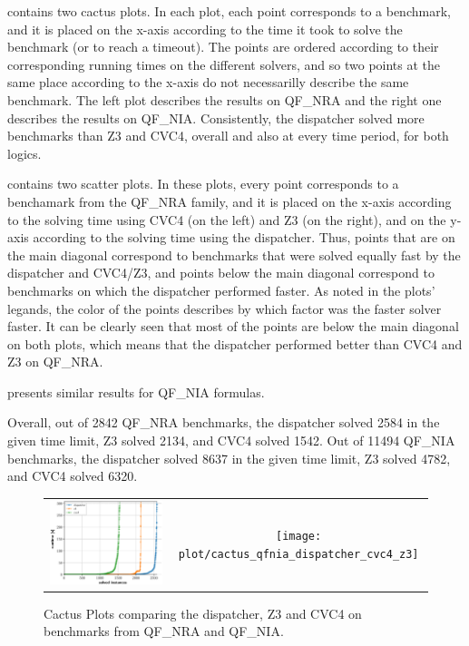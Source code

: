 \documentclass{article}
\begin{document}
 contains two cactus plots.
In each plot, each point corresponds to a benchmark, and it
is placed on the x-axis according to the time
it took to solve the benchmark (or to reach a timeout).
The points are ordered according to their corresponding
running times on the different solvers, and so
two points at the same place according to the x-axis
do not necessarilly describe the same benchmark.
The left plot describes the results on QF\_NRA and
the right one describes the results on QF\_NIA.
Consistently, the dispatcher solved more benchmarks
than Z3 and CVC4, overall and also at every time period,
for both logics.

 contains two scatter plots.
In these plots, every point corresponds to a benchamark
from the QF\_NRA family,
and it is placed on the x-axis according to the
solving time using CVC4 (on the left) and Z3 (on the right),
and on the y-axis according to the solving time using
the dispatcher.
%
Thus, points that are on the main diagonal correspond to benchmarks that
were solved equally fast by the dispatcher and CVC4/Z3,
and points below the main diagonal correspond
to benchmarks on which the dispatcher performed
faster.
%
As noted in the plots' legands, the color of the points
describes by which factor was the faster solver faster.
%
It can be clearly seen that most of the points are below the main diagonal on both plots,
which means that the dispatcher performed better
than CVC4 and Z3 on QF\_NRA.

 presents similar results for QF\_NIA formulas.

Overall, out of 2842 QF\_NRA benchmarks,
the dispatcher solved 2584 in the given time limit,
Z3 solved 2134, and
CVC4 solved 1542.
%
Out of 11494 QF\_NIA benchmarks,
the dispatcher solved 8637 in the given time limit,
Z3 solved 4782, and
CVC4 solved 6320.


\begin{figure}
\begin{center}
\begin{tabular}{cc}
\includegraphics[width=.5\textwidth]{plot/cactus_qfnra_dispatcher_cvc4_z3}
&
\texttt{[image: plot/cactus\_qfnia\_dispatcher\_cvc4\_z3]}  
\end{tabular}
\end{center}
\caption{\label{cactus}Cactus Plots comparing the dispatcher, Z3 and CVC4 on benchmarks from QF\_NRA and QF\_NIA.}
\end{figure}
\end{document}
